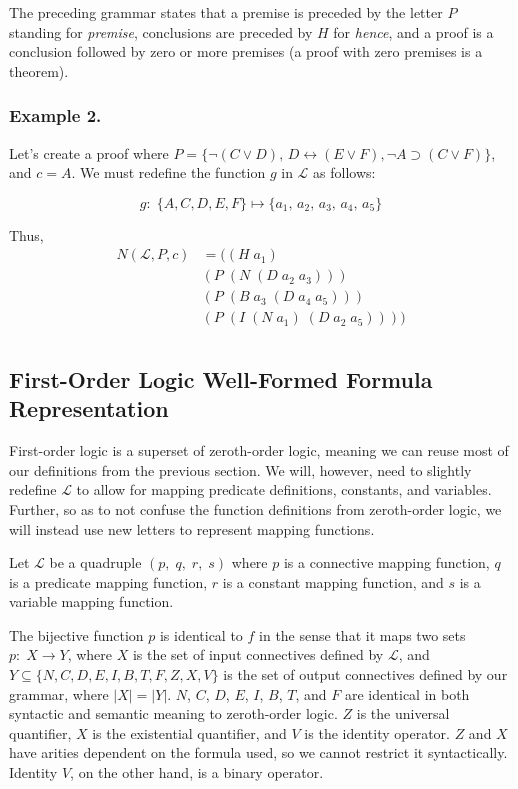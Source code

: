 \documentclass[ms]{uncgdissertationexp2}
\theoremstyle{plain}
\theoremstyle{definition}
\theoremstyle{remark}
\begin{document}
The preceding grammar states that a premise is preceded by the letter $P$ standing for \textit{premise}, conclusions are preceded by $H$ for \textit{hence}, and a proof is a conclusion followed by zero or more premises (a proof with zero premises is a theorem).\\


\subsubsection{Example 2.}
Let's create a proof where $P = \{\lnot(C \lor D),\,D \leftrightarrow (E \lor F), \lnot A \supset (C \lor F)\}$, and $c = A$. We must redefine the function $g$ in $\mathcal{L}$ as follows:

\[
    g:\;\{A, C, D, E, F\} \mapsto \{a_1,\,a_2,\,a_3,\,a_4,\,a_5\}
\]

\noindent Thus, 
\begin{align*}
    N(\mathcal{L}, P, c) &= ((H\;a_1)\;\\
    &(P\;(N\;(D\;a_2\;a_3)))\\
    &(P\;(B\;a_3\;(D\;a_4\;a_5)))\\
    &(P\;(I\;(N\;a_1)\;(D\;a_2\;a_5))))\\
\end{align*}

\subsection{First-Order Logic Well-Formed Formula Representation}

First-order logic is a superset of zeroth-order logic, meaning we can reuse most of our definitions from the previous section. We will, however, need to slightly redefine $\mathcal{L}$ to allow for mapping predicate definitions, constants, and variables. Further, so as to not confuse the function definitions from zeroth-order logic, we will instead use new letters to represent mapping functions.

Let $\mathcal{L}$ be a quadruple $(p,\;q,\;r,\;s)$ where $p$ is a connective mapping function, $q$ is a predicate mapping function, $r$ is a constant mapping function, and $s$ is a variable mapping function. 

The bijective function $p$ is identical to $f$ in the sense that it maps two sets $p:\;X \to Y$, where $X$ is the set of input connectives defined by $\mathcal{L}$, and $Y \subseteq \{N, C, D, E, I, B, T, F, Z, X, V\}$ is the set of output connectives defined by our grammar, where $|X| = |Y|$. $N$, $C$, $D$, $E$, $I$, $B$, $T$, and $F$ are identical in both syntactic and semantic meaning to zeroth-order logic. $Z$ is the universal quantifier, $X$ is the existential quantifier, and $V$ is the identity operator. $Z$ and $X$ have arities dependent on the formula used, so we cannot restrict it syntactically. Identity $V$, on the other hand, is a binary operator.
\end{document}
